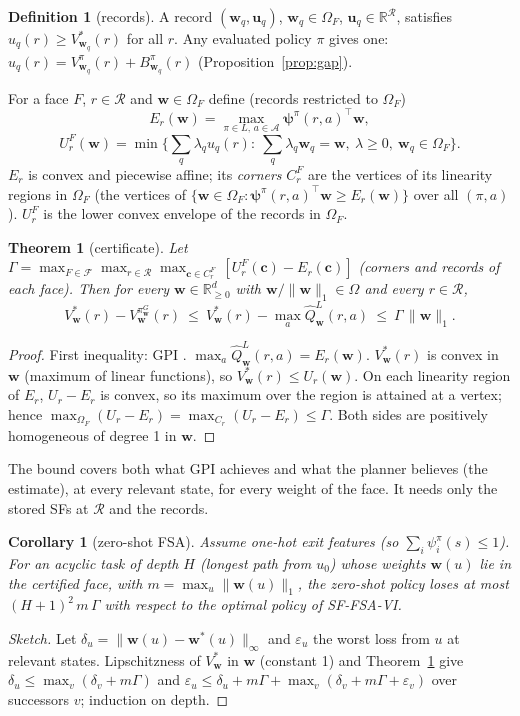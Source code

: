 \documentclass[11pt]{article}
\newcommand{\vpsi}{\bm{\psi}}
\newcommand{\w}{\mathbf{w}}
\newcommand{\cA}{\mathcal A}
\newcommand{\cR}{\mathcal R}
\newcommand{\R}{\mathbb R}
\newtheorem{theorem}{Theorem}
\newtheorem{corollary}{Corollary}
\theoremstyle{definition}
\newtheorem{definition}{Definition}
\begin{document}
\begin{definition}[records]
A record $(\w_q,\mathbf u_q)$, $\w_q\in\Omega_F$, $\mathbf u_q\in\R^{\cR}$, satisfies $u_q(r)\ge V^*_{\w_q}(r)$ for all
$r$. Any evaluated policy $\pi$ gives one: $u_q(r)=V^\pi_{\w_q}(r)+B^\pi_{\w_q}(r)$ (Proposition~\ref{prop:gap}).
\end{definition}

For a face $F$, $r\in\cR$ and $\w\in\Omega_F$ define (records restricted to $\Omega_F$)
\[
E_r(\w)=\max_{\pi\in L,\,a\in\cA}\vpsi^\pi(r,a)^\top\w,
\]
\[
U^F_r(\w)=\min\Big\{\textstyle\sum_q\lambda_qu_q(r):\ \sum_q\lambda_q\w_q=\w,\ \lambda\ge0,\ \w_q\in\Omega_F\Big\}.
\]
$E_r$ is convex and piecewise affine; its \emph{corners} $C^F_r$ are the vertices of its linearity regions in
$\Omega_F$ (the vertices of $\{\w\in\Omega_F:\vpsi^\pi(r,a)^\top\w\ge E_r(\w)\}$ over all $(\pi,a)$). $U^F_r$ is the lower
convex envelope of the records in $\Omega_F$.

\begin{theorem}[certificate]\label{thm:cert}
Let $\Gamma=\max_{F\in\mathcal F}\max_{r\in\cR}\max_{\mathbf c\in C^F_r}\,[U^F_r(\mathbf c)-E_r(\mathbf c)]$ (corners and
records of each face). Then for every $\w\in\R^d_{\ge0}$ with $\w/\|\w\|_1\in\Omega$ and every $r\in\cR$,
\[
V^*_\w(r)-V^{\pi^G_\w}_\w(r)\ \le\ V^*_\w(r)-\max_a\hat Q^L_\w(r,a)\ \le\ \Gamma\,\|\w\|_1 .
\]
\end{theorem}
\begin{proof}
First inequality: GPI \cite{barreto17}. $\max_a\hat Q^L_\w(r,a)=E_r(\w)$. $V^*_\w(r)$ is convex in $\w$ (maximum of
linear functions), so $V^*_\w(r)\le U_r(\w)$. On each linearity region of $E_r$, $U_r-E_r$ is convex, so its maximum
over the region is attained at a vertex; hence $\max_{\Omega_F}(U_r-E_r)=\max_{C_r}(U_r-E_r)\le\Gamma$. Both sides
are positively homogeneous of degree 1 in $\w$.
\end{proof}

\noindent The bound covers both what GPI achieves and what the planner believes (the estimate), at every
relevant state, for every weight of the face. It needs only the stored SFs at $\cR$ and the records.

\begin{corollary}[zero-shot FSA]\label{cor:fsa}
Assume one-hot exit features (so $\sum_i\psi^\pi_i(s)\le1$). For an acyclic task of depth $H$ (longest path from
$u_0$) whose weights $\w(u)$ lie in the certified face, with $m=\max_u\|\w(u)\|_1$, the zero-shot policy loses at
most $(H+1)^2\,m\,\Gamma$ with respect to the optimal policy of SF-FSA-VI.
\end{corollary}
\begin{proof}[Sketch]
Let $\delta_u=\|\w(u)-\w^*(u)\|_\infty$ and $\varepsilon_u$ the worst loss from $u$ at relevant states. Lipschitzness of
$V^*_\w$ in $\w$ (constant 1) and Theorem~\ref{thm:cert} give $\delta_u\le\max_v(\delta_v+m\Gamma)$ and
$\varepsilon_u\le\delta_u+m\Gamma+\max_v(\delta_v+m\Gamma+\varepsilon_v)$ over successors $v$; induction on depth.
\end{proof}
\end{document}
